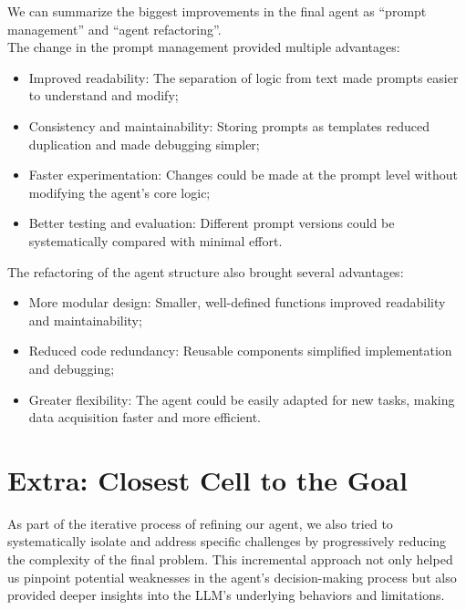 We can summarize the biggest improvements in the final agent as ``prompt
management'' and ``agent refactoring''.\\The change in the prompt management provided
multiple advantages:
\begin{itemize}
  \item Improved readability: The separation of logic from text made prompts
    easier to understand and modify;

  \item Consistency and maintainability: Storing prompts as templates reduced
    duplication and made debugging simpler;

  \item Faster experimentation: Changes could be made at the prompt level
    without modifying the agent's core logic;

  \item Better testing and evaluation: Different prompt versions could be
    systematically compared with minimal effort.
\end{itemize}
The refactoring of the agent structure also brought several advantages:
\begin{itemize}
  \item More modular design: Smaller, well-defined functions improved readability
    and maintainability;

  \item Reduced code redundancy: Reusable components simplified implementation
    and debugging;

  \item Greater flexibility: The agent could be easily adapted for new tasks, making
    data acquisition faster and more efficient.
\end{itemize}

\section{Extra: Closest Cell to the Goal}
\label{sec:closest_cell_to_the_goal}

As part of the iterative process of refining our agent, we also tried to
systematically isolate and address specific challenges by progressively reducing
the complexity of the final problem. This incremental approach not only helped us
pinpoint potential weaknesses in the agent's decision-making process but also provided
deeper insights into the LLM's underlying behaviors and limitations.

